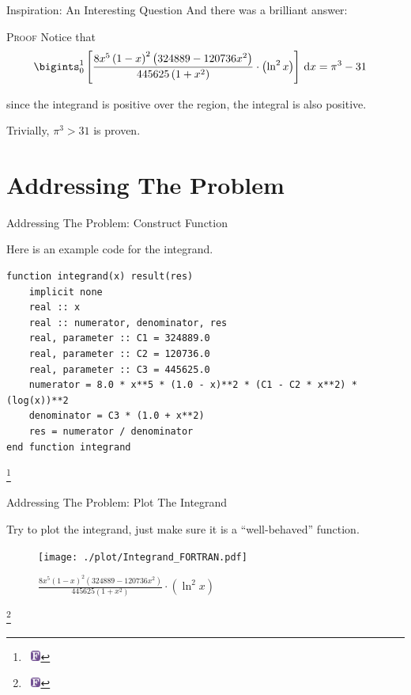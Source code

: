 \documentclass[10pt, xcolor = svgnames]{beamer} %
\newcommand{\cald}{{\rm d}}
\newcommand{\FORTRAN}[0]{~\includegraphics[height = 9.5pt]{./logos/Fortran.pdf}}
\newcommand\blfootnote[1]{
  \begingroup
  \renewcommand\thefootnote{}\footnote{#1}
  \addtocounter{footnote}{-1}
  \endgroup
}
\begin{document}
\begin{frame}[fragile]{Inspiration: An Interesting Question}
And there was a brilliant answer:

\begin{exampleblock}{\textsc{Proof}}
Notice that
\begin{align}
	\bigints_0^1 \left[ \frac{8 x^5 \left( 1 - x \right)^2 \left( 324889 - 120736 x^2 \right) }{445625 \left( 1 + x^2 \right) } \cdot \left( \ln^2 x \right) \right] \,\cald x
	&= \pi^3 - 31
\end{align}

since the integrand is positive over the region, the integral is also positive.

Trivially, $\pi^3 > 31$ is proven.
\end{exampleblock}
\end{frame}



\section{Addressing The Problem}

\begin{frame}[fragile]{Addressing The Problem: Construct Function}


Here is an example code for the integrand.
\begin{lstlisting}
function integrand(x) result(res)
    implicit none
    real :: x
    real :: numerator, denominator, res
    real, parameter :: C1 = 324889.0
    real, parameter :: C2 = 120736.0
    real, parameter :: C3 = 445625.0
    numerator = 8.0 * x**5 * (1.0 - x)**2 * (C1 - C2 * x**2) * (log(x))**2
    denominator = C3 * (1.0 + x**2)
    res = numerator / denominator
end function integrand
\end{lstlisting}
\blfootnote{\FORTRAN}
\end{frame}

\begin{frame}[fragile]{Addressing The Problem: Plot The Integrand}

Try to plot the integrand, just make sure it is a ``well-behaved'' function.

\begin{figure}
\centering
\texttt{[image: ./plot/Integrand\_FORTRAN.pdf]}
\caption{$\frac{8 x^5 \left( 1 - x \right)^2 \left( 324889 - 120736 x^2 \right) }{445625 \left( 1 + x^2 \right) } \cdot \left( \ln^2 x \right)$}
\label{plot1}
\end{figure}
\blfootnote{\FORTRAN}
\end{frame}
\end{document}
